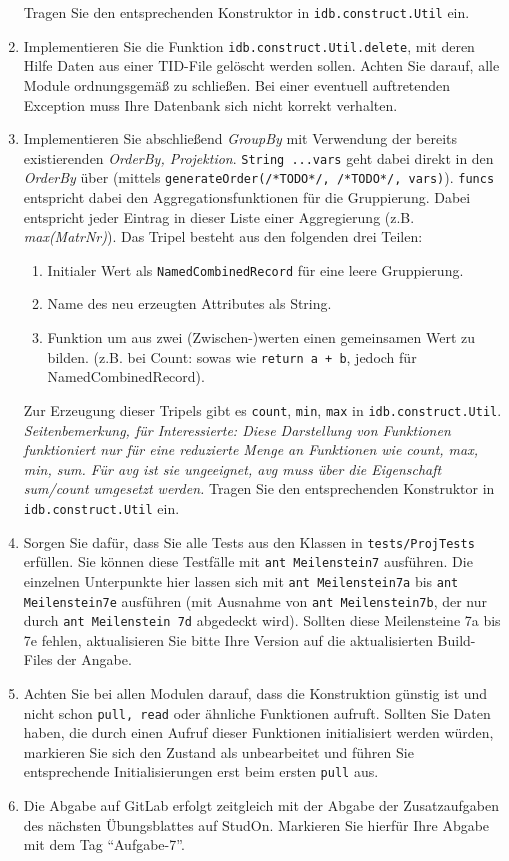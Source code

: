 \begin{enumerate}
		Tragen Sie den entsprechenden Konstruktor in \texttt{idb.construct.Util} ein.
	\item Implementieren Sie die Funktion \texttt{idb.construct.Util.delete}, mit deren Hilfe Daten aus einer TID-File gelöscht werden sollen.
		Achten Sie darauf, alle Module ordnungsgemäß zu schließen.
		Bei einer eventuell auftretenden Exception muss Ihre Datenbank sich nicht korrekt verhalten.
	\item Implementieren Sie abschließend \textit{GroupBy} mit Verwendung der bereits existierenden \textit{OrderBy, Projektion}. \texttt{String ...vars} geht dabei direkt in den \textit{OrderBy} über (mittels \texttt{generateOrder(/*TODO*/, /*TODO*/, vars)}).
		\texttt{funcs} entspricht dabei den Aggregationsfunktionen für die Gruppierung.
		Dabei entspricht jeder Eintrag in dieser Liste einer Aggregierung (z.B. \textit{max(MatrNr)}).
		Das Tripel besteht aus den folgenden drei Teilen:
		\begin{enumerate}
			\item Initialer Wert als \texttt{NamedCombinedRecord} für eine leere Gruppierung.
			\item Name des neu erzeugten Attributes als String.
			\item Funktion um aus zwei (Zwischen-)werten einen gemeinsamen Wert zu bilden. (z.B. bei Count: sowas wie \texttt{return a + b}, jedoch für NamedCombinedRecord).
		\end{enumerate}
		Zur Erzeugung dieser Tripels gibt es \texttt{count}, \texttt{min}, \texttt{max} in \texttt{idb.construct.Util}.
		\textit{Seitenbemerkung, für Interessierte: Diese Darstellung von Funktionen funktioniert nur für eine reduzierte Menge an Funktionen wie count, max, min, sum.
		Für avg ist sie ungeeignet, avg muss über die Eigenschaft sum/count umgesetzt werden.}
		Tragen Sie den entsprechenden Konstruktor in \texttt{idb.construct.Util} ein.
	\item Sorgen Sie dafür, dass Sie alle Tests aus den Klassen in \texttt{tests/ProjTests} erfüllen.
	Sie können diese Testfälle mit \lstinline|ant Meilenstein7| ausführen.
	Die einzelnen Unterpunkte hier lassen sich mit \lstinline|ant Meilenstein7a| bis \lstinline |ant Meilenstein7e| ausführen (mit Ausnahme von \lstinline|ant Meilenstein7b|, der nur durch \lstinline|ant Meilenstein 7d| abgedeckt wird).
	Sollten diese Meilensteine 7a bis 7e fehlen, aktualisieren Sie bitte Ihre Version auf die aktualisierten Build-Files der Angabe.
	\item Achten Sie bei allen Modulen darauf, dass die Konstruktion günstig ist und nicht schon \texttt{pull, read} oder ähnliche Funktionen aufruft.
		Sollten Sie Daten haben, die durch einen Aufruf dieser Funktionen initialisiert werden würden, markieren Sie sich den Zustand als unbearbeitet und führen Sie entsprechende Initialisierungen erst beim ersten \texttt{pull} aus.
	\item Die Abgabe auf GitLab erfolgt zeitgleich mit der Abgabe der Zusatzaufgaben des nächsten Übungsblattes auf StudOn. Markieren Sie hierfür Ihre Abgabe mit dem Tag "`Aufgabe-7"'.
\end{enumerate}
